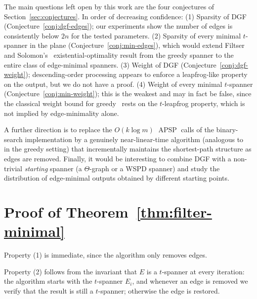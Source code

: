 \documentclass{cccg26}
\DeclareMathOperator{\APSP}{APSP}
\begin{document}
The main questions left open by this work are the four conjectures of
Section~\ref{sec:conjectures}. In order of decreasing confidence:
(1) Sparsity of DGF (Conjecture~\ref{conj:dgf-edges}); our experiments
show the number of edges is consistently below $2n$ for the tested
parameters. (2) Sparsity of every minimal $t$-spanner in the plane
(Conjecture~\ref{conj:min-edges}), which would extend Filtser and
Solomon's~\cite{FS20} existential-optimality result from the greedy
spanner to the entire class of edge-minimal spanners. (3) Weight of
DGF (Conjecture~\ref{conj:dgf-weight}); descending-order processing
appears to enforce a leapfrog-like property on the output, but we do
not have a proof. (4) Weight of every minimal $t$-spanner
(Conjecture~\ref{conj:min-weight}); this is the weakest and may in
fact be false, since the classical weight bound for
greedy~\cite{CDNS95,DHN93,DNS95} rests on the $t$-leapfrog property,
which is not implied by edge-minimality alone.

A further direction is to replace the $O(k\log m)$ $\APSP$ calls of
the binary-search implementation by a genuinely near-linear-time
algorithm (analogous to~\cite{GLN02,BCFMS10,ABBB15} in the greedy
setting) that incrementally maintains the shortest-path structure as
edges are removed. Finally, it would be interesting to combine DGF
with a non-trivial \emph{starting} spanner (a $\Theta$-graph or a WSPD
spanner) and study the distribution of edge-minimal outputs obtained
by different starting points.



\small




\newpage
\appendix

\section{Proof of Theorem~\ref{thm:filter-minimal}}
\label{app:filter-proof}

Property (1) is immediate, since the algorithm only removes edges.

Property (2) follows from the invariant that $E$ is a $t$-spanner at
every iteration: the algorithm starts with the $t$-spanner $E_i$, and
whenever an edge is removed we verify that the result is still a
$t$-spanner; otherwise the edge is restored.
\end{document}

